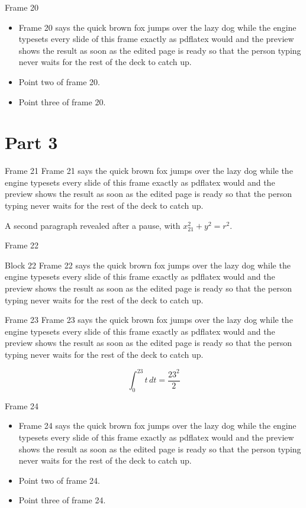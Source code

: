 \documentclass{beamer}
\begin{document}
\begin{frame}{Frame 20}
  \begin{itemize}
    \item<1-> Frame 20 says the quick brown fox jumps over the lazy dog while the engine typesets every slide of this frame exactly as pdflatex would and the preview shows the result as soon as the edited page is ready so that the person typing never waits for the rest of the deck to catch up.
    \item<2-> Point two of frame 20.
    \item<3-> Point three of frame 20.
  \end{itemize}
\end{frame}
\section{Part 3}
\begin{frame}{Frame 21}
  Frame 21 says the quick brown fox jumps over the lazy dog while the engine typesets every slide of this frame exactly as pdflatex would and the preview shows the result as soon as the edited page is ready so that the person typing never waits for the rest of the deck to catch up.
  \pause

  A second paragraph revealed after a pause, with $x_{21}^2 + y^2 = r^2$.
\end{frame}
\begin{frame}{Frame 22}
  \begin{block}{Block 22}
    Frame 22 says the quick brown fox jumps over the lazy dog while the engine typesets every slide of this frame exactly as pdflatex would and the preview shows the result as soon as the edited page is ready so that the person typing never waits for the rest of the deck to catch up.
  \end{block}
\end{frame}
\begin{frame}{Frame 23}
  Frame 23 says the quick brown fox jumps over the lazy dog while the engine typesets every slide of this frame exactly as pdflatex would and the preview shows the result as soon as the edited page is ready so that the person typing never waits for the rest of the deck to catch up.

  \[ \int_0^{23} t\,dt = \frac{23^2}{2} \]
\end{frame}
\begin{frame}{Frame 24}
  \begin{itemize}
    \item<1-> Frame 24 says the quick brown fox jumps over the lazy dog while the engine typesets every slide of this frame exactly as pdflatex would and the preview shows the result as soon as the edited page is ready so that the person typing never waits for the rest of the deck to catch up.
    \item<2-> Point two of frame 24.
    \item<3-> Point three of frame 24.
  \end{itemize}
\end{frame}
\end{document}
